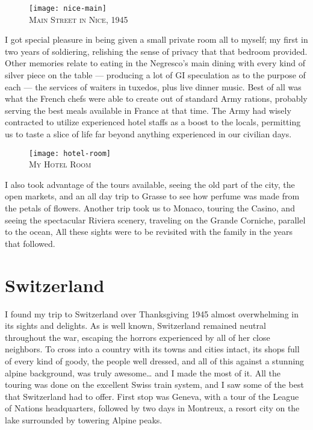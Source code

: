 \documentclass[../m3y]{subfiles}
\begin{document}
\begin{figure}[h]
\centering
\texttt{[image: nice-main]}\\
\medskip
{\newtimes\textsc{Main Street in Nice, 1945}}
\end{figure}

I got special pleasure in being given a small private room all to myself; my first in two years of soldiering, relishing the sense of privacy that that bedroom provided. Other memories relate to eating in the Negresco's main dining with every kind of silver piece on the table --- producing a lot of GI speculation as to the purpose of each --- the services of waiters in tuxedos, plus live dinner music. Best of all was what the French chefs were able to create out of standard Army rations, probably serving the best meals available in France at that time. The Army had wisely contracted to utilize experienced hotel staffs as a boost to the locals, permitting us to taste a slice of life far beyond anything experienced in our civilian days.

\begin{figure}
\centering
\texttt{[image: hotel-room]}\\
\medskip
{\newtimes\textsc{My Hotel Room}}
\end{figure}

I also took advantage of the tours available, seeing the old part of the city, the open markets, and an all day trip to Grasse to see how perfume was made from the petals of flowers. Another trip took us to Monaco, touring the Casino, and seeing the spectacular Riviera scenery, traveling on the Grande Corniche, parallel to the ocean, All these sights were to be revisited with the family in the years that followed.

\section{Switzerland}
I found my trip to Switzerland over Thanksgiving 1945 almost overwhelming in its sights and delights. As is well known, Switzerland remained neutral throughout the war, escaping the horrors experienced by all of her close neighbors. To cross into a country with its towns and cities intact, its shops full of every kind of goody, the people well dressed, and all of this against a stunning alpine background, was truly awesome… and I made the most of it. All the touring was done on the excellent Swiss train system, and I saw some of the best that Switzerland had to offer. First stop was Geneva, with a tour of the League of Nations headquarters, followed by two days in Montreux, a resort city on the lake surrounded by towering Alpine peaks.
\end{document}
